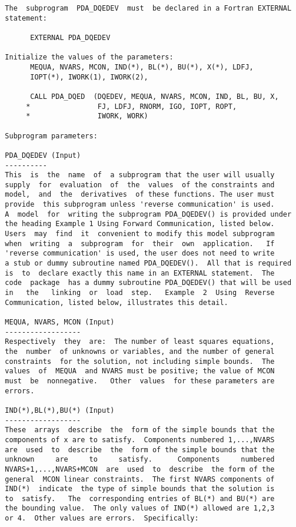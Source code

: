 \begin{verbatim}
  The  subprogram  PDA_DQEDEV  must  be declared in a Fortran EXTERNAL
  statement:

        EXTERNAL PDA_DQEDEV

  Initialize the values of the parameters:
        MEQUA, NVARS, MCON, IND(*), BL(*), BU(*), X(*), LDFJ,
        IOPT(*), IWORK(1), IWORK(2),

        CALL PDA_DQED  (DQEDEV, MEQUA, NVARS, MCON, IND, BL, BU, X,
       *                FJ, LDFJ, RNORM, IGO, IOPT, ROPT,
       *                IWORK, WORK)

  Subprogram parameters:

  PDA_DQEDEV (Input)
  ----------
  This  is  the  name  of  a subprogram that the user will usually
  supply  for  evaluation  of  the  values  of the constraints and
  model,  and  the  derivatives  of these functions. The user must
  provide  this subprogram unless 'reverse communication' is used.
  A  model  for  writing the subprogram PDA_DQEDEV() is provided under
  the heading Example 1 Using Forward Communication, listed below.
  Users  may  find  it  convenient to modify this model subprogram
  when  writing  a  subprogram  for  their  own  application.   If
  'reverse communication' is used, the user does not need to write
  a stub or dummy subroutine named PDA_DQEDEV().  All that is required
  is  to  declare exactly this name in an EXTERNAL statement.  The
  code  package  has a dummy subroutine PDA_DQEDEV() that will be used
  in   the   linking  or  load  step.   Example  2  Using  Reverse
  Communication, listed below, illustrates this detail.

  MEQUA, NVARS, MCON (Input)
  ------------------
  Respectively  they  are:  The number of least squares equations,
  the  number  of unknowns or variables, and the number of general
  constraints  for the solution, not including simple bounds.  The
  values  of  MEQUA  and NVARS must be positive; the value of MCON
  must  be  nonnegative.   Other  values  for these parameters are
  errors.

  IND(*),BL(*),BU(*) (Input)
  ------------------
  These  arrays  describe  the  form of the simple bounds that the
  components of x are to satisfy.  Components numbered 1,...,NVARS
  are  used  to  describe  the  form of the simple bounds that the
  unknown     are     to     satisfy.      Components     numbered
  NVARS+1,...,NVARS+MCON  are  used  to  describe  the form of the
  general  MCON linear constraints.  The first NVARS components of
  IND(*)  indicate  the type of simple bounds that the solution is
  to  satisfy.   The  corresponding entries of BL(*) and BU(*) are
  the bounding value.  The only values of IND(*) allowed are 1,2,3
  or 4.  Other values are errors.  Specifically:


\end{verbatim}
